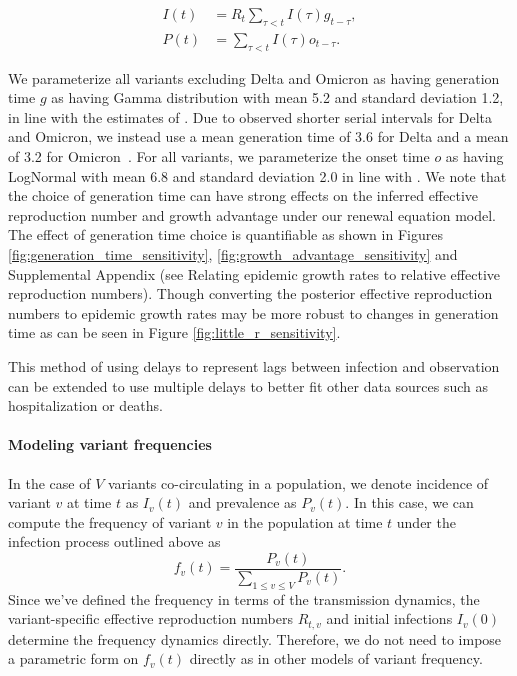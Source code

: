 \begin{align}
  I(t) &= R_{t} \sum_{\tau < t} I(\tau) g_{t-\tau},\\
  P(t) &= \sum_{\tau < t} I(\tau) o_{t-\tau}.
\end{align}

We parameterize all variants excluding Delta and Omicron as having generation time $g$ as having Gamma distribution with mean 5.2 and standard deviation 1.2, in line with the estimates of \cite{Ganyani2020}.
Due to observed shorter serial intervals for Delta and Omicron, we instead use a mean generation time of 3.6 for Delta and a mean of 3.2 for Omicron\ \cite{Backer2022, Ryu2022, Song2022}.
For all variants, we parameterize the onset time $o$ as having LogNormal with mean 6.8 and standard deviation 2.0 in line with \cite{Cheng2021}.
We note that the choice of generation time can have strong effects on the inferred effective reproduction number and growth advantage under our renewal equation model.
The effect of generation time choice is quantifiable as shown in Figures \ref{fig:generation_time_sensitivity}, \ref{fig:growth_advantage_sensitivity} and Supplemental Appendix (see Relating epidemic growth rates to relative effective reproduction numbers).
Though converting the posterior effective reproduction numbers to epidemic growth rates may be more robust to changes in generation time as can be seen in Figure \ref{fig:little_r_sensitivity}.

This method of using delays to represent lags between infection and observation can be extended to use multiple delays to better fit other data sources such as hospitalization or deaths.

\paragraph{Modeling variant frequencies}%

In the case of $V$ variants co-circulating in a population, we denote incidence of variant $v$ at time $t$ as $I_{v}(t)$ and prevalence as $P_{v}(t)$.
In this case, we can compute the frequency of variant $v$ in the population at time $t$ under the infection process outlined above as
\begin{equation}
  f_{v}(t) = \frac{P_{v}(t)}{ \sum_{1\leq v \leq V} P_{v}(t)}.
\end{equation}
Since we've defined the frequency in terms of the transmission dynamics, the variant-specific effective reproduction numbers $R_{t,v}$ and initial infections $I_{v}(0)$ determine the frequency dynamics directly.
Therefore, we do not need to impose a parametric form on $f_{v}(t)$ directly as in other models of variant frequency.

